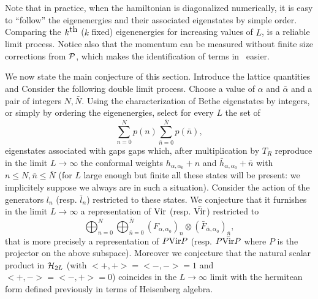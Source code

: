Note that in practice, when the hamiltonian is diagonalized numerically,
 it is easy to ``follow''  the eigenenergies and their
associated eigenstates by simple order. Comparing the $k^{\hbox{th}}$
 ($k$ fixed)
eigenenergies for increasing  values of  $L$, is a reliable limit process.
Notice also that  the momentum can be measured without finite size
corrections from ${\cal P}$, which makes the identification of terms in
\limitone\
 easier.


We now state the main conjecture of this section. Introduce the
 lattice quantities
%
\eqn\lattvir{l_n={L\over 2\pi}\left\{-{\gamma\over\pi\sin\gamma}\sum_{j=1}^{2L}
e^{inj\pi/L}\left(e_j-e_\infty
+{i\gamma\over\pi\sin\gamma}[e_j,e_{j+1}]\right)\right\}+{c\over
24}\delta_{n,0},}
%
and
%
\eqn{}
%
Consider the following double limit process. Choose a value of $\alpha$ and
$\bar{\alpha}$ and a pair of
integers $N,\bar{N}$.
Using the characterization of Bethe eigenstates by integers, or
simply by ordering the
eigenenergies, select for every $L$ the set of
$$
\sum_{n=0}^Np(n)\sum_{\bar{n}=0}^{\bar{N}}p(\bar{n}),
$$
eigenstates associated with gaps gaps which, after multiplication by $T_R$
reproduce in the limit $L\rightarrow\infty$ the conformal weights
 $h_{\alpha,\alpha_0}+n$
and $\bar{h}_{\alpha,\alpha_0}+\bar{n}$ with $n\leq N,\bar{n}\leq\bar{N}$
 (for $L$ large enough
but finite all these states will be present: we implicitely suppose we
 always are in such
 a situation). Consider the action of the generators $l_n$ (resp.
$\bar{l}_n$) restricted to these
states. We conjecture that it furnishes in the limit $L\rightarrow\infty$ a
representation
 of $\hbox{Vir}$
 (resp. $\bar{\hbox{Vir}}$) restricted to
$$
\bigoplus_{n=0}^N\bigoplus_{\bar{n}=0}^{\bar{N}}\left(F_{\alpha,\alpha_0}
\right)_n\otimes\left(\bar{F}_{\bar{\alpha},\alpha_0}\right)_{\bar{n}},
$$
that is  more precisely a representation of $P\hbox{Vir}P$ (resp.
$P\bar{\hbox{Vir}}P$ where $P$ is the projector on the
above subspace).  Moreover we conjecture that the  natural scalar product in
${\cal H}_{2L}$
(with $<+,+>=<-,->=1$ and $<+,->=<-,+>=0$) coincides in
the $L\rightarrow\infty$ limit
with the hermitean form defined previously  in terms of Heisenberg algebra.


